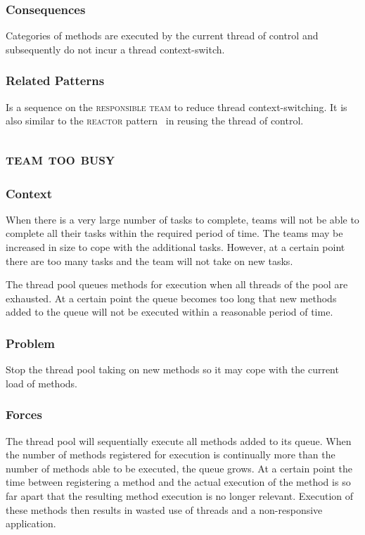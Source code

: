 \documentclass[prodmode]{style/acmlarge}
\begin{document}
\subsubsection*{Consequences} Categories of methods are executed by the current
thread of control and subsequently do not incur a thread context-switch.

\subsubsection*{Related Patterns} Is a sequence on the \textsc{responsible team}
to reduce thread context-switching.  It is also similar to the \textsc{reactor}
pattern~\cite{reactor} in reusing the thread of control.



\subsection{\textsc{\textbf{team too busy}}}

\subsubsection*{Context} When there is a very large number of tasks to complete,
teams will not be able to complete all their tasks within the required period of
time.  The teams may be increased in size to cope with the additional tasks.
However, at a certain point there are too many tasks and the team will not take
on new tasks.

The thread pool queues methods for execution when all threads of the pool are
exhausted.  At a certain point the queue becomes too long that new methods added
to the queue will not be executed within a reasonable period of time.

\subsubsection*{Problem} Stop the thread pool taking on new methods so it may
cope with the current load of methods.

\subsubsection*{Forces} The thread pool will sequentially execute all methods
added to its queue.  When the number of methods registered for execution is
continually more than the number of methods able to be executed, the queue
grows.  At a certain point the time between registering a method and the actual
execution of the method is so far apart that the resulting method execution is
no longer relevant.  Execution of these methods then results in wasted use of
threads and a non-responsive application.
\end{document}

